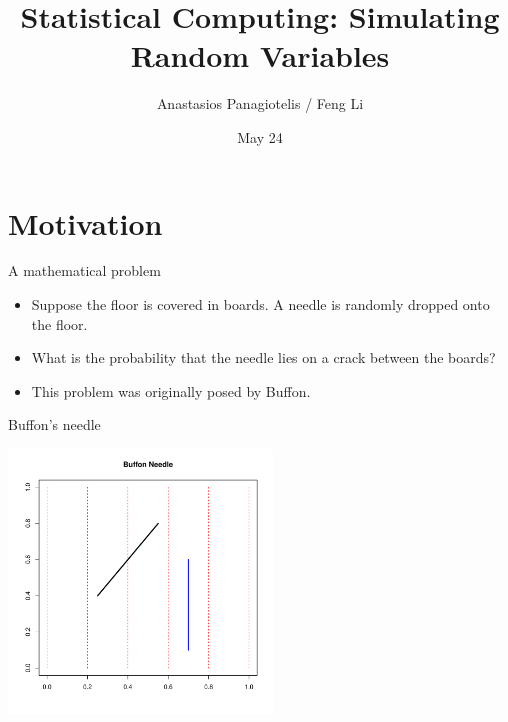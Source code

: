 \documentclass
[handout]
{beamer}
\begin{document}
\title[Simulation]{Statistical Computing: Simulating Random Variables}
\date{May 24}
\author{Anastasios Panagiotelis / Feng Li}
\maketitle
\section{Motivation}
\begin{frame}{A mathematical  problem}
\begin{itemize}
\item Suppose the floor is covered in boards.  A needle is randomly dropped onto the floor.
\pause
\item What is the probability that the needle lies on a crack between the boards?
\pause
\item This problem was originally posed by Buffon.
\end{itemize}
\end{frame}
\begin{frame}{Buffon's needle}
\begin{center}
\includegraphics[height=7cm]{./Pics/buffonneedle.pdf}
\end{center}
\end{frame}
\end{document}
